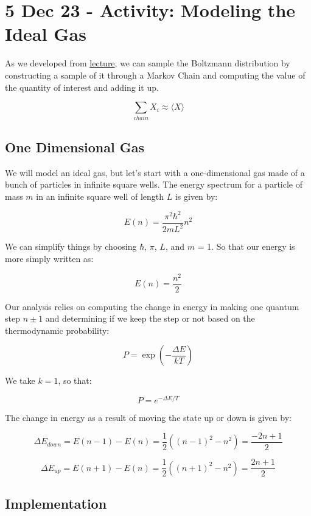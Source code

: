 \section{5 Dec 23 - Activity: Modeling the Ideal
Gas}\label{dec-23---activity-modeling-the-ideal-gas}

As we developed from
\href{https://github.com/dannycab/phy415msu/blob/main/MMIPbook/assets/pdfs/notes/Notes_4_Markov_Chain.pdf}{lecture},
we can sample the Boltzmann distribution by constructing a sample of it
through a Markov Chain and computing the value of the quantity of
interest and adding it up.

\[\sum_{chain} X_i \approx \langle X \rangle\]

\subsection{One Dimensional Gas}\label{one-dimensional-gas}

We will model an ideal gas, but let's start with a one-dimensional gas
made of a bunch of particles in infinite square wells. The energy
spectrum for a particle of mass \(m\) in an infinite square well of
length \(L\) is given by:

\[E(n) = \dfrac{\pi^2 \hbar^2}{2mL^2}n^2\]

We can simplify things by choosing \(\hbar\), \(\pi\), \(L\), and \(m\)
= 1. So that our energy is more simply written as:

\[E(n) = \dfrac{n^2}{2}\]

Our analysis relies on computing the change in energy in making one
quantum step \(n \pm 1\) and determining if we keep the step or not
based on the thermodynamic probability:

\[P = \exp(-\dfrac{\Delta E}{kT})\]

We take \(k=1\), so that:

\[P = e^{-\Delta E/T}\]

The change in energy as a result of moving the state up or down is given
by:

\[\Delta E_{down} = E(n-1) - E(n) = \dfrac{1}{2}\left((n-1)^2-n^2\right) = \dfrac{-2n+1}{2}\]

\[\Delta E_{up} = E(n+1) - E(n) = \dfrac{1}{2}\left((n+1)^2-n^2\right) = \dfrac{2n+1}{2}\]

\subsection{Implementation}\label{implementation}

